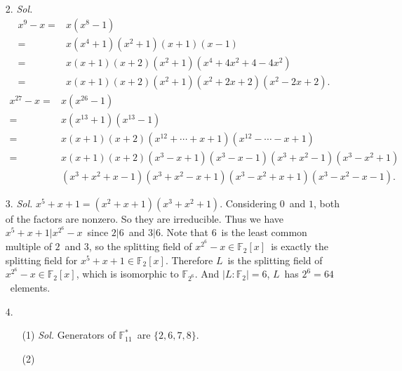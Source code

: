 \documentclass[12pt]{article}
\newcommand{\F}{\mathbb{F}}
\begin{document}
\begin{enumerate}
\begin{enumerate}
\begin{proof}
			\quad By the extension lemma, there exists a ring isomorphism $j$\ from $K(\alpha)$\ to $K(\beta)$, which satisfies $j(k)=k$\ for any $k\in K$\ and $j(\alpha)=\beta$. Regard $K(\beta)$\ as a subfield of $M$, we can write $j:K(\alpha)\to M$. Note that $L$\ is the splitting field of $f\in K(\alpha)[x]$. To see that, the splitting field of $f$, regarded as a polynomial in $K(\alpha)[x]$, is $K(\alpha)(\alpha,a_2,...,a_n)=K(\alpha,a_2,...,a_n)=L$. Now that $L$\ is a splitting field of $K(\alpha)$, we can extend $j:K(\alpha)\to M$\ to $\tilde{\phi}:L\to M$\ be the extension lemma. Again by the extension lemma, $\phi=\tilde{\phi}$. So $\tilde{\phi}(L)=\phi(L)=L$, and $\beta=\tilde{\phi}(\alpha)\in L$.
		\end{proof}
	\end{enumerate}
	\item[2.]
	\textit{Sol.}
		$$\begin{aligned}
			x^9-x
			=&x(x^8-1)\\
			=&x(x^4+1)(x^2+1)(x+1)(x-1)\\
			=&x(x+1)(x+2)(x^2+1)(x^4+4x^2+4-4x^2)\\
			=&x(x+1)(x+2)(x^2+1)(x^2+2x+2)(x^2-2x+2).
		\end{aligned}$$
		$$\begin{aligned}
			x^{27}-x
			=&x(x^{26}-1)\\
			=&x(x^{13}+1)(x^{13}-1)\\
			=&x(x+1)(x+2)(x^{12}+\cdots+x+1)(x^{12}-\cdots-x+1)\\
			=&x(x+1)(x+2)(x^3-x+1)(x^3-x-1)(x^3+x^2-1)(x^3-x^2+1)\\
			&(x^3+x^2+x-1)(x^3+x^2-x+1)(x^3-x^2+x+1)(x^3-x^2-x-1).
		\end{aligned}$$
	\item[3.]
	\textit{Sol.}
		\quad $x^5+x+1=(x^2+x+1)(x^3+x^2+1)$. Considering $0$\ and $1$, both of the factors are nonzero. So they are irreducible. Thus we have $x^5+x+1|x^{2^6}-x$\ since $2|6$\ and $3|6$. Note that $6$\ is the least common multiple of $2$\ and $3$, so the splitting field of $x^{2^6}-x\in\F_2[x]$\ is exactly the splitting field for $x^5+x+1\in\F_2[x]$. Therefore $L$\ is the splitting field of $x^{2^6}-x\in\F_2[x]$, which is isomorphic to $\F_{2^6}$. And $|L:\F_2|=6$, $L$\ has $2^6=64$\ elements.
	\item[4.]
	\begin{enumerate}
		\item[(1)]
		\textit{Sol.}
			\quad Generators of $\F_{11}^*$\ are $\{2,6,7,8\}$.
		\item[(2)]

\end{enumerate}
\end{enumerate}
\end{document}
